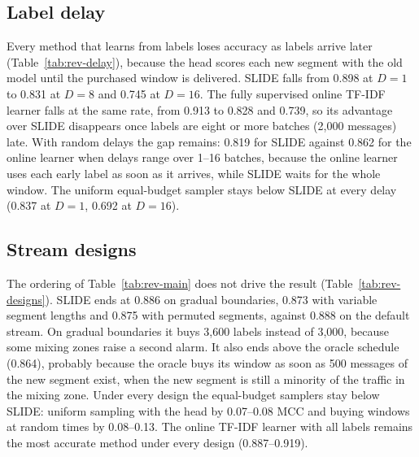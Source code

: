 

\subsection{Label delay}\label{sec:delay}
Every method that learns from labels loses accuracy as labels arrive later (Table~\ref{tab:rev-delay}), because the head scores each new segment with the old model until the purchased window is delivered. SLIDE falls from 0.898 at $D=1$ to 0.831 at $D=8$ and 0.745 at $D=16$. The fully supervised online TF-IDF learner falls at the same rate, from 0.913 to 0.828 and 0.739, so its advantage over SLIDE disappears once labels are eight or more batches (2{,}000 messages) late. With random delays the gap remains: 0.819 for SLIDE against 0.862 for the online learner when delays range over 1--16 batches, because the online learner uses each early label as soon as it arrives, while SLIDE waits for the whole window. The uniform equal-budget sampler stays below SLIDE at every delay (0.837 at $D=1$, 0.692 at $D=16$).



\subsection{Stream designs}\label{sec:designs}
The ordering of Table~\ref{tab:rev-main} does not drive the result (Table~\ref{tab:rev-designs}). SLIDE ends at 0.886 on gradual boundaries, 0.873 with variable segment lengths and 0.875 with permuted segments, against 0.888 on the default stream. On gradual boundaries it buys 3{,}600 labels instead of 3{,}000, because some mixing zones raise a second alarm. It also ends above the oracle schedule (0.864), probably because the oracle buys its window as soon as 500 messages of the new segment exist, when the new segment is still a minority of the traffic in the mixing zone. Under every design the equal-budget samplers stay below SLIDE: uniform sampling with the head by 0.07--0.08 MCC and buying windows at random times by 0.08--0.13. The online TF-IDF learner with all labels remains the most accurate method under every design (0.887--0.919).



